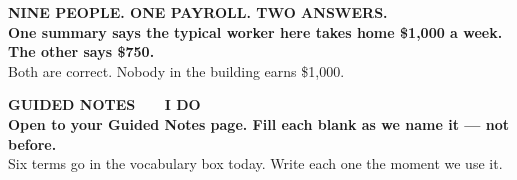 \documentclass[aspectratio=169, 11pt]{beamer}
\begin{document}
{
\begin{frame}[plain]
  \vspace{1.5cm}
  \begin{center}
    {\color{skymid}\bfseries\small NINE PEOPLE. ONE PAYROLL. TWO ANSWERS.}\\[0.9cm]
    {\color{white}\bfseries\Large One summary says the typical worker here takes home
    \$1{,}000 a week.\\[0.4cm]
    The other says \$750.}\\[0.9cm]
    {\color{goldacc}\small Both are correct. Nobody in the building earns \$1{,}000.}
  \end{center}
\end{frame}
}

{
\begin{frame}[plain]
  \vspace{1.8cm}\hspace{0.8cm}%
  \begin{minipage}{0.86\textwidth}
    {\color{goldacc}\bfseries\small GUIDED NOTES \ \textbullet\ \ I DO}\\[0.7cm]
    {\color{white}\bfseries\Large Open to your Guided Notes page. Fill each blank as we
    name it --- not before.}\\[0.9cm]
    {\color{skymid}\small Six terms go in the vocabulary box today. Write each one the
    moment we use it.}
  \end{minipage}
\end{frame}
}
\end{document}
